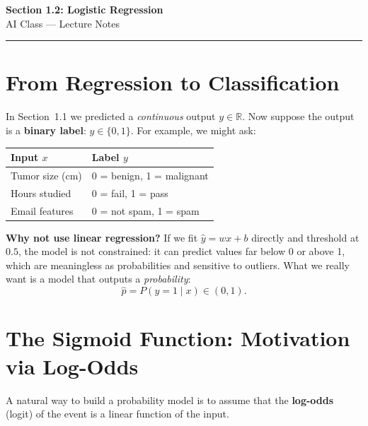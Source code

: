 \documentclass[12pt, a4paper]{article}
\newif\ifstudentmode
\theoremstyle{definition}
\newcommand{\yhat}{\hat{y}}
\begin{document}
\begin{center}
  {\LARGE \textbf{Section 1.2: Logistic Regression}} \\[0.5em]
  {\large AI Class — Lecture Notes}%
  \ifstudentmode
    \quad {\normalsize\color{gray}[Student Copy]}%
  \fi
\end{center}

\vspace{1em}
\hrule
\vspace{1.5em}

\section{From Regression to Classification}

In Section~1.1 we predicted a \emph{continuous} output $y \in \mathbb{R}$.
Now suppose the output is a \textbf{binary label}: $y \in \{0, 1\}$.
For example, we might ask:

\begin{center}
  \renewcommand{\arraystretch}{1.2}
  \begin{tabular}{ll}
    \toprule
    \textbf{Input $x$} & \textbf{Label $y$}        \\
    \midrule
    Tumor size (cm)    & 0 = benign, 1 = malignant \\
    Hours studied      & 0 = fail, 1 = pass        \\
    Email features     & 0 = not spam, 1 = spam    \\
    \bottomrule
  \end{tabular}
\end{center}

\textbf{Why not use linear regression?}
If we fit $\yhat = wx + b$ directly and threshold at $0.5$, the model is
not constrained: it can predict values far below 0 or above 1, which are
meaningless as probabilities and sensitive to outliers.
What we really want is a model that outputs a \emph{probability}:
\[
  \hat{p} = P(y = 1 \mid x) \in (0, 1).
\]

\section{The Sigmoid Function: Motivation via Log-Odds}

A natural way to build a probability model is to assume that the
\textbf{log-odds} (logit) of the event is a linear function of the input.
\end{document}
